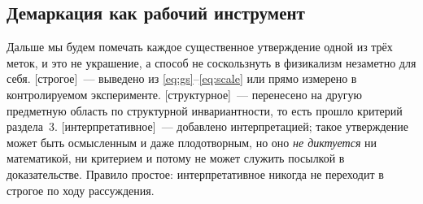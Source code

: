 \documentclass[11pt]{article}
\newcommand{\tS}{{\small\sffamily\color{accyan}[строгое]}}
\newcommand{\tT}{{\small\sffamily\color{acmag}[структурное]}}
\newcommand{\tI}{{\small\sffamily\color{acgrey}[интерпретативное]}}
\begin{document}
\subsection{Демаркация как рабочий инструмент}
Дальше мы будем помечать каждое существенное утверждение одной из трёх меток, и это не украшение, а способ не
соскользнуть в физикализм незаметно для себя. \tS~— выведено из \eqref{eq:gs}–\eqref{eq:scale} или прямо измерено
в контролируемом эксперименте. \tT~— перенесено на другую предметную область по структурной инвариантности, то
есть прошло критерий раздела~3. \tI~— добавлено интерпретацией; такое утверждение может быть осмысленным и даже
плодотворным, но оно \emph{не диктуется} ни математикой, ни критерием и потому не может служить посылкой в
доказательстве. Правило простое: интерпретативное никогда не переходит в строгое по ходу рассуждения.

\end{document}
